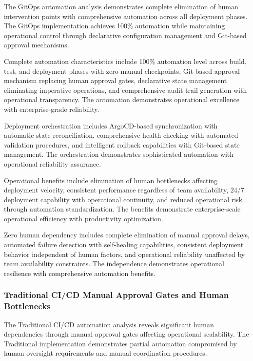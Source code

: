 The GitOps automation analysis demonstrates complete elimination of human intervention points with comprehensive automation across all deployment phases. The GitOps implementation achieves 100\% automation while maintaining operational control through declarative configuration management and Git-based approval mechanisms.

Complete automation characteristics include 100\% automation level across build, test, and deployment phases with zero manual checkpoints, Git-based approval mechanism replacing human approval gates, declarative state management eliminating imperative operations, and comprehensive audit trail generation with operational transparency. The automation demonstrates operational excellence with enterprise-grade reliability.

Deployment orchestration includes ArgoCD-based synchronization with automatic state reconciliation, comprehensive health checking with automated validation procedures, and intelligent rollback capabilities with Git-based state management. The orchestration demonstrates sophisticated automation with operational reliability assurance.

Operational benefits include elimination of human bottlenecks affecting deployment velocity, consistent performance regardless of team availability, 24/7 deployment capability with operational continuity, and reduced operational risk through automation standardization. The benefits demonstrate enterprise-scale operational efficiency with productivity optimization.

Zero human dependency includes complete elimination of manual approval delays, automated failure detection with self-healing capabilities, consistent deployment behavior independent of human factors, and operational reliability unaffected by team availability constraints. The independence demonstrates operational resilience with comprehensive automation benefits.

\subsubsection{Traditional CI/CD Manual Approval Gates and Human Bottlenecks}

The Traditional CI/CD automation analysis reveals significant human dependencies through manual approval gates affecting operational scalability. The Traditional implementation demonstrates partial automation compromised by human oversight requirements and manual coordination procedures.

